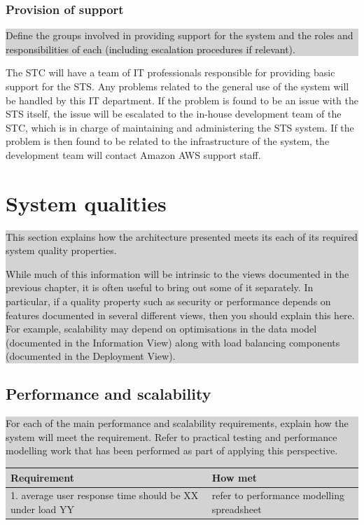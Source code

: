 \documentclass[a4paper,11pt]{report}
\newcommand{\instructions}[1]{
  \noindent\colorbox{lightgray}{%
    \parbox{\linewidth}{%
      #1
    }%
  }%
 \vspace{0.1cm}
}
\begin{document}
\subsection{Provision of support}
\label{sec:provision-support}

\instructions{
Define the groups involved in providing support for the system and the
roles and responsibilities of each (including escalation procedures if
relevant).
}

The STC will have a team of IT professionals responsible for providing basic
support for the STS. Any problems related to the general use of the system will
be handled by this IT department. If the problem is found to be an issue with 
the STS itself, the issue will be escalated to the in-house development team of
the STC, which is in charge of maintaining and administering the STS system. If
the problem is then found to be related to the infrastructure of the system, 
the development team will contact Amazon AWS support staff.

\chapter{System qualities}
\label{cha:system-qualities}
\thispagestyle{fancy}

\instructions{
This section explains how the architecture presented
  meets its each of its required system quality properties.

While much of this information will be intrinsic to the views
documented in the previous chapter, it is often useful to bring out
some of it separately. In particular, if a quality property such as
security or performance depends on features documented in several
different views, then you should explain this here. For example,
scalability may depend on optimisations in the data model (documented
in the Information View) along with load balancing components
(documented in the Deployment View).
}

\section{Performance and scalability}
\label{sec:perf-scal}

\instructions{
For each of the main performance and scalability requirements, explain
how the system will meet the requirement. Refer to practical testing
and performance modelling work that has been performed as part of
applying this perspective.

\begin{center}
  \begin{tabular}[h!]{| p{0.4\textwidth} | p{0.5\textwidth} |}
    \hline
    \rowcolor{gray}
    Requirement & How met \\
    \hline
    \hline
    1. average user response time should be XX under load YY & refer
    to performance modelling spreadsheet\\

    \hline
 \end{tabular}
\end{center}

}
\end{document}
